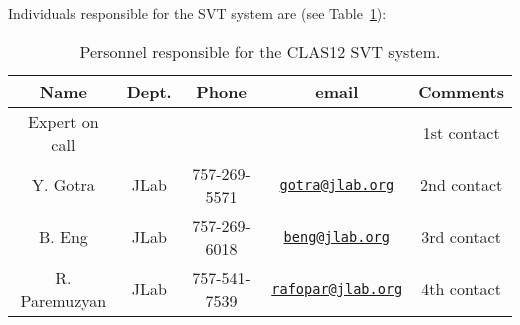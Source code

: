 Individuals responsible for the SVT system are (see Table~\ref{tb:svt}):

\begin{table}[htbp]
\centering
\begin{tabular}{|c|c|c|c|c|} \hline
Name&Dept.&Phone&email&Comments \\ \hline
Expert on call& &&& 1st contact \\ \hline
Y. Gotra& JLab&757-269-5571&\href{mailto:gotra@jlab.org}{\nolinkurl{gotra@jlab.org}}&2nd contact \\ \hline
B. Eng&JLab&757-269-6018&\href{mailto:beng@jlab.org}{\nolinkurl{beng@jlab.org}}&3rd contact \\ \hline
R. Paremuzyan&JLab&757-541-7539&\href{mailto:rafopar@jlab.org}{\nolinkurl{rafopar@jlab.org}}&4th contact \\ \hline
\end{tabular}
\caption{Personnel responsible for the CLAS12 SVT system.} 
\label{tb:svt}
\end{table}

